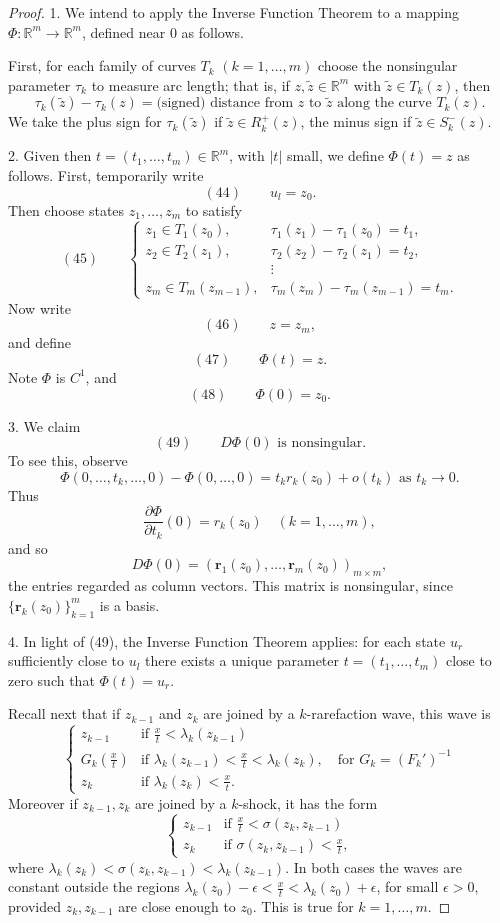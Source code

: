 \begin{proof}
1. We intend to apply the Inverse Function Theorem to a mapping $\Phi:\mathbb{R}^m\to\mathbb{R}^m$, defined near $0$ as follows.

First, for each family of curves $T_k$ $(k=1,\ldots,m)$ choose the nonsingular parameter $\tau_k$ to measure arc length; that is, if $z,\tilde z\in\mathbb{R}^m$ with $\tilde z\in T_k(z)$, then
$$\tau_k(\tilde z) - \tau_k(z) = \text{(signed) distance from } z \text{ to } \tilde z \text{ along the curve } T_k(z).$$
We take the plus sign for $\tau_k(\tilde z)$ if $\tilde z\in R_k^+(z)$, the minus sign if $\tilde z\in S_k^-(z)$.

2. Given then $t=(t_1,\ldots,t_m)\in\mathbb{R}^m$, with $|t|$ small, we define $\Phi(t)=z$ as follows. First, temporarily write
$$(44) \qquad u_l = z_0.$$
Then choose states $z_1,\ldots,z_m$ to satisfy
$$(45) \qquad \begin{cases} z_1\in T_1(z_0), & \tau_1(z_1)-\tau_1(z_0)=t_1, \\ z_2\in T_2(z_1), & \tau_2(z_2)-\tau_2(z_1)=t_2, \\ & \vdots \\ z_m\in T_m(z_{m-1}), & \tau_m(z_m)-\tau_m(z_{m-1})=t_m. \end{cases}$$
Now write
$$(46) \qquad z=z_m,$$
and define
$$(47) \qquad \Phi(t) = z.$$
Note $\Phi$ is $C^1$, and
$$(48) \qquad \Phi(0) = z_0.$$

3. We claim
$$(49) \qquad D\Phi(0) \text{ is nonsingular.}$$
To see this, observe
$$\Phi(0,\ldots,t_k,\ldots,0) - \Phi(0,\ldots,0) = t_k r_k(z_0) + o(t_k) \text{ as } t_k\to 0.$$
Thus
$$\frac{\partial\Phi}{\partial t_k}(0) = r_k(z_0) \quad (k=1,\ldots,m),$$
and so
$$D\Phi(0) = (\mathbf{r}_1(z_0),\ldots,\mathbf{r}_m(z_0))_{m\times m},$$
the entries regarded as column vectors. This matrix is nonsingular, since $\{\mathbf{r}_k(z_0)\}_{k=1}^m$ is a basis.

4. In light of (49), the Inverse Function Theorem applies: for each state $u_r$ sufficiently close to $u_l$ there exists a unique parameter $t=(t_1,\ldots,t_m)$ close to zero such that $\Phi(t)=u_r$.

Recall next that if $z_{k-1}$ and $z_k$ are joined by a $k$-rarefaction wave, this wave is
$$\begin{cases} z_{k-1} & \text{if } \frac{x}{t}<\lambda_k(z_{k-1}) \\ G_k\left(\frac{x}{t}\right) & \text{if } \lambda_k(z_{k-1})<\frac{x}{t}<\lambda_k(z_k), \quad \text{for } G_k=(F_k')^{-1} \\ z_k & \text{if } \lambda_k(z_k)<\frac{x}{t}. \end{cases}$$
Moreover if $z_{k-1},z_k$ are joined by a $k$-shock, it has the form
$$\begin{cases} z_{k-1} & \text{if } \frac{x}{t}<\sigma(z_k,z_{k-1}) \\ z_k & \text{if } \sigma(z_k,z_{k-1})<\frac{x}{t}, \end{cases}$$
where $\lambda_k(z_k)<\sigma(z_k,z_{k-1})<\lambda_k(z_{k-1})$. In both cases the waves are constant outside the regions $\lambda_k(z_0)-\epsilon<\frac{x}{t}<\lambda_k(z_0)+\epsilon$, for small $\epsilon>0$, provided $z_k,z_{k-1}$ are close enough to $z_0$. This is true for $k=1,\ldots,m$.


\end{proof}
